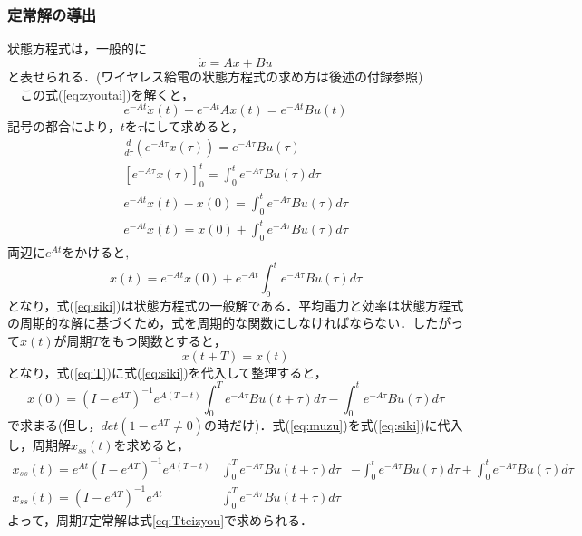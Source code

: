 \documentclass[12pt]{jarticle}
\begin{document}
\subsubsection{定常解の導出}
状態方程式は，一般的に
\begin{equation}
\label{eq:zyoutai}
\dot{x}=Ax+Bu
\end{equation}
と表せられる．(ワイヤレス給電の状態方程式の求め方は後述の付録参照)
\\　この式(\ref{eq:zyoutai})を解くと，
\begin{equation}
e^{-At}\dot{x}(t)-e^{-At}Ax(t)=e^{-At}Bu(t)
\end{equation}
記号の都合により，$tを\tau$にして求めると，
\begin{eqnarray}
\frac{d}{d\tau}(e^{-A\tau}x(\tau))=e^{-A\tau}Bu(\tau)\\
\left[e^{-A\tau}x(\tau)\right]^t_0=\int_{0}^{t}e^{-A\tau}Bu(\tau)d\tau\\
e^{-At}x(t)-x(0)=\int_{0}^{t}e^{-A\tau}Bu(\tau)d\tau\nonumber\\
e^{-At}x(t)=x(0)+\int_{0}^{t}e^{-A\tau}Bu(\tau)d\tau
\end{eqnarray}
$両辺にe^{At}をかけると,$
\begin{equation}
\label{eq:siki}
x(t)=e^{-At}x(0)+e^{-At}\int_{0}^{t}e^{-A\tau}Bu(\tau)d\tau
\end{equation}
となり，式(\ref{eq:siki})は状態方程式の一般解である．平均電力と効率は状態方程式の周期的な解に基づくため，式を周期的な関数にしなければならない．したがって$x(t)が周期Tをもつ関数とすると，$
\begin{equation}
\label{eq:T}
x(t+T)=x(t)
\end{equation}
となり，式(\ref{eq:T})に式(\ref{eq:siki})を代入して整理すると，
\begin{equation}
\label{eq:muzu}
x(0)=(I-e^{AT})^{-1}e^{A(T-t)}\int_{0}^{T}e^{-A\tau}Bu(t+\tau)d\tau-\int_{0}^{t}e^{-A\tau}Bu(\tau)d\tau
\end{equation}
で求まる(但し，$det(1-e^{AT}\neq0)$の時だけ)．式(\ref{eq:muzu})を式(\ref{eq:siki})に代入し，周期解$x_{ss}(t)$を求めると，
\begin{eqnarray}
x_{ss}(t)=e^{At}(I-e^{AT})^{-1}e^{A(T-t)}&\int_{0}^{T}e^{-A\tau}Bu(t+\tau)d\tau&-\int_{0}^{t}e^{-A\tau}Bu(\tau)d\tau+\int_{0}^{t}e^{-A\tau}Bu(\tau)d\tau\nonumber\\
x_{ss}(t)=(I-e^{AT})^{-1}e^{At}&\int_{0}^{T}e^{-A\tau}Bu(t+\tau)d\tau&
\label{eq:Tteizyou}
\end{eqnarray}
よって，周期$T$定常解は式\ref{eq:Tteizyou}で求められる．
\end{document}
